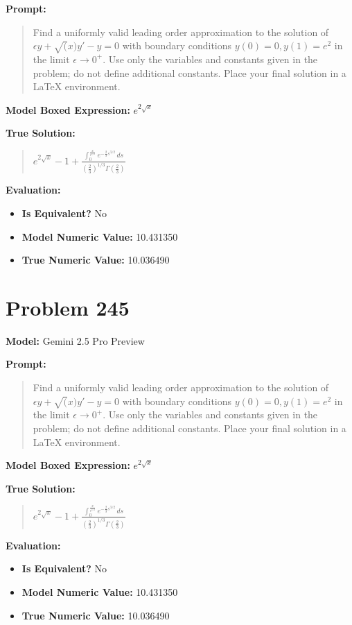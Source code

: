 \documentclass{article}
\begin{document}
{\textbf{Prompt:}
\begin{quote}
Find a uniformly valid leading order approximation to the solution of $\epsilon y + \sqrt(x) y' - y = 0$ with boundary conditions $y(0)=0, y(1)=e^2$ in the limit $\epsilon \to 0^+$. Use only the variables and constants given in the problem; do not define additional constants. Place your final solution in a $\boxed{}$ LaTeX environment.
\end{quote}
\textbf{Model Boxed Expression:} $e^{2\sqrt{x}}$

\textbf{True Solution:}
\begin{quote}
$e^{2\sqrt{x}} - 1 + \frac{\int_0^{\frac{x}{\epsilon^{2/3}}} e^{-\frac{2}{3}s^{3/2}} \, ds}{\left(\frac{2}{3}\right)^{1/3} \Gamma\left(\frac{2}{3}\right)}$
\end{quote}

\textbf{Evaluation:}
\begin{itemize}
\item \textbf{Is Equivalent?} No
\item \textbf{Model Numeric Value:} 10.431350
\item \textbf{True Numeric Value:} 10.036490
\end{itemize}
\vspace{1cm}
\section*{Problem 245}
\textbf{Model:} Gemini 2.5 Pro Preview

\textbf{Prompt:}
\begin{quote}
Find a uniformly valid leading order approximation to the solution of $\epsilon y + \sqrt(x) y' - y = 0$ with boundary conditions $y(0)=0, y(1)=e^2$ in the limit $\epsilon \to 0^+$. Use only the variables and constants given in the problem; do not define additional constants. Place your final solution in a $\boxed{}$ LaTeX environment.
\end{quote}
\textbf{Model Boxed Expression:} $e^{2\sqrt{x}}$

\textbf{True Solution:}
\begin{quote}
$e^{2\sqrt{x}} - 1 + \frac{\int_0^{\frac{x}{\epsilon^{2/3}}} e^{-\frac{2}{3}s^{3/2}} \, ds}{\left(\frac{2}{3}\right)^{1/3} \Gamma\left(\frac{2}{3}\right)}$
\end{quote}

\textbf{Evaluation:}
\begin{itemize}
\item \textbf{Is Equivalent?} No
\item \textbf{Model Numeric Value:} 10.431350
\item \textbf{True Numeric Value:} 10.036490
\end{itemize}
\vspace{1cm}
}
\end{document}
